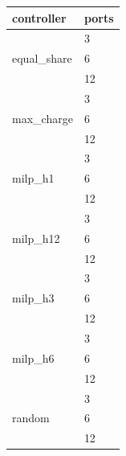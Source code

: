 \begin{tabular}{ll}
\toprule
controller & ports \\
\midrule
\multirow[t]{3}{*}{equal_share} & 3 \\
 & 6 \\
 & 12 \\
\cline{1-2}
\multirow[t]{3}{*}{max_charge} & 3 \\
 & 6 \\
 & 12 \\
\cline{1-2}
\multirow[t]{3}{*}{milp_h1} & 3 \\
 & 6 \\
 & 12 \\
\cline{1-2}
\multirow[t]{3}{*}{milp_h12} & 3 \\
 & 6 \\
 & 12 \\
\cline{1-2}
\multirow[t]{3}{*}{milp_h3} & 3 \\
 & 6 \\
 & 12 \\
\cline{1-2}
\multirow[t]{3}{*}{milp_h6} & 3 \\
 & 6 \\
 & 12 \\
\cline{1-2}
\multirow[t]{3}{*}{random} & 3 \\
 & 6 \\
 & 12 \\
\cline{1-2}
\bottomrule
\end{tabular}
